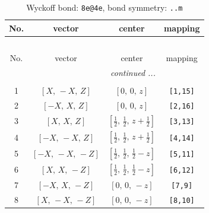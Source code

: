 \documentclass[fleqn,8pt]{jsarticle}
\begin{document}
\begin{longtable}{cccc}
\caption{Wyckoff bond: {\tt 8e@4e}, bond symmetry: {\tt ..m}}
 \\
 \hline \hline
No. & vector & center & mapping \\ \hline \endfirsthead

\multicolumn{3}{l}{\tablename\ \thetable{}} \\
 \hline \hline
No. & vector & center & mapping \\ \hline \endhead

 \hline \hline
\multicolumn{3}{r}{\footnotesize\it continued ...} \\ \endfoot

 \hline \hline
\multicolumn{3}{r}{} \\ \endlastfoot

1 & $\left[ X,\, - X,\, Z \right]$ & $\left[ 0,\, 0,\, z \right]$ & {\tt [1,15]} \\ \hline
2 & $\left[ - X,\, X,\, Z \right]$ & $\left[ 0,\, 0,\, z \right]$ & {\tt [2,16]} \\ \hline
3 & $\left[ X,\, X,\, Z \right]$ & $\left[ \frac{1}{2},\, \frac{1}{2},\, z + \frac{1}{2} \right]$ & {\tt [3,13]} \\ \hline
4 & $\left[ - X,\, - X,\, Z \right]$ & $\left[ \frac{1}{2},\, \frac{1}{2},\, z + \frac{1}{2} \right]$ & {\tt [4,14]} \\ \hline
5 & $\left[ - X,\, - X,\, - Z \right]$ & $\left[ \frac{1}{2},\, \frac{1}{2},\, \frac{1}{2} - z \right]$ & {\tt [5,11]} \\ \hline
6 & $\left[ X,\, X,\, - Z \right]$ & $\left[ \frac{1}{2},\, \frac{1}{2},\, \frac{1}{2} - z \right]$ & {\tt [6,12]} \\ \hline
7 & $\left[ - X,\, X,\, - Z \right]$ & $\left[ 0,\, 0,\, - z \right]$ & {\tt [7,9]} \\ \hline
8 & $\left[ X,\, - X,\, - Z \right]$ & $\left[ 0,\, 0,\, - z \right]$ & {\tt [8,10]} \\
\end{longtable}
\renewcommand{\arraystretch}{1.2}
\end{document}
